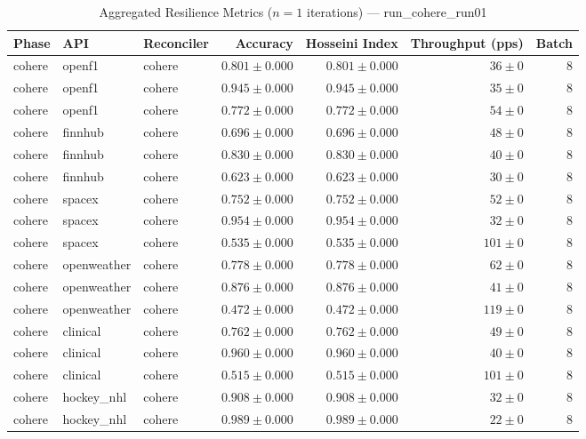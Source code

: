 
\begin{table}[htbp]
\caption{Aggregated Resilience Metrics ($n=1$ iterations) --- run_cohere_run01}
\begin{tabular}{l l l r r r r}
\hline
Phase & API & Reconciler & Accuracy & Hosseini Index & Throughput (pps) & Batch \\
\hline
cohere & openf1 & cohere & $0.801\pm0.000$ & $0.801\pm0.000$ & $36\pm0$ & 8 \\
cohere & openf1 & cohere & $0.945\pm0.000$ & $0.945\pm0.000$ & $35\pm0$ & 8 \\
cohere & openf1 & cohere & $0.772\pm0.000$ & $0.772\pm0.000$ & $54\pm0$ & 8 \\
cohere & finnhub & cohere & $0.696\pm0.000$ & $0.696\pm0.000$ & $48\pm0$ & 8 \\
cohere & finnhub & cohere & $0.830\pm0.000$ & $0.830\pm0.000$ & $40\pm0$ & 8 \\
cohere & finnhub & cohere & $0.623\pm0.000$ & $0.623\pm0.000$ & $30\pm0$ & 8 \\
cohere & spacex & cohere & $0.752\pm0.000$ & $0.752\pm0.000$ & $52\pm0$ & 8 \\
cohere & spacex & cohere & $0.954\pm0.000$ & $0.954\pm0.000$ & $32\pm0$ & 8 \\
cohere & spacex & cohere & $0.535\pm0.000$ & $0.535\pm0.000$ & $101\pm0$ & 8 \\
cohere & openweather & cohere & $0.778\pm0.000$ & $0.778\pm0.000$ & $62\pm0$ & 8 \\
cohere & openweather & cohere & $0.876\pm0.000$ & $0.876\pm0.000$ & $41\pm0$ & 8 \\
cohere & openweather & cohere & $0.472\pm0.000$ & $0.472\pm0.000$ & $119\pm0$ & 8 \\
cohere & clinical & cohere & $0.762\pm0.000$ & $0.762\pm0.000$ & $49\pm0$ & 8 \\
cohere & clinical & cohere & $0.960\pm0.000$ & $0.960\pm0.000$ & $40\pm0$ & 8 \\
cohere & clinical & cohere & $0.515\pm0.000$ & $0.515\pm0.000$ & $101\pm0$ & 8 \\
cohere & hockey\_nhl & cohere & $0.908\pm0.000$ & $0.908\pm0.000$ & $32\pm0$ & 8 \\
cohere & hockey\_nhl & cohere & $0.989\pm0.000$ & $0.989\pm0.000$ & $22\pm0$ & 8 \\

\end{tabular}
\end{table}
